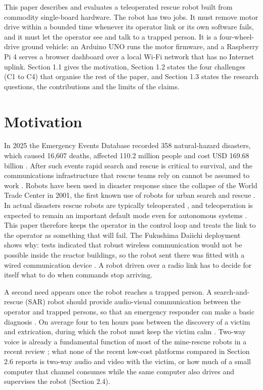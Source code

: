 This paper describes and evaluates a teleoperated rescue robot built from commodity single-board hardware. The robot has two jobs. It must remove motor drive within a bounded time whenever its operator link or its own software fails, and it must let the operator see and talk to a trapped person. It is a four-wheel-drive ground vehicle: an Arduino UNO runs the motor firmware, and a Raspberry Pi 4 serves a browser dashboard over a local Wi-Fi network that has no Internet uplink. Section 1.1 gives the motivation, Section 1.2 states the four challenges (C1 to C4) that organise the rest of the paper, and Section 1.3 states the research questions, the contributions and the limits of the claims.

\section{Motivation}

In 2025 the Emergency Events Database recorded 358 natural-hazard disasters, which caused 16,607 deaths, affected 110.2 million people and cost USD 169.68 billion \cite{cred2026}. After such events rapid search and rescue is critical to survival, and the communications infrastructure that rescue teams rely on cannot be assumed to work \cite{tabib2024}. Robots have been used in disaster response since the collapse of the World Trade Center in 2001, the first known use of robots for urban search and rescue \cite{murphy2004}. In actual disasters rescue robots are typically teleoperated \cite{daun2023}, and teleoperation is expected to remain an important default mode even for autonomous systems \cite{chen2007}. This paper therefore keeps the operator in the control loop and treats the link to the operator as something that will fail. The Fukushima Daiichi deployment shows why: tests indicated that robust wireless communication would not be possible inside the reactor buildings, so the robot sent there was fitted with a wired communication device \cite{nagatani2013}. A robot driven over a radio link has to decide for itself what to do when commands stop arriving.

A second need appears once the robot reaches a trapped person. A search-and-rescue (SAR) robot should provide audio-visual communication between the operator and trapped persons, so that an emergency responder can make a basic diagnosis \cite{schneider2016}. On average four to ten hours pass between the discovery of a victim and extrication, during which the robot must keep the victim calm \cite{srinivasan2012}. Two-way voice is already a fundamental function of most of the mine-rescue robots in a recent review \cite{bakzadeh2026}; what none of the recent low-cost platforms compared in Section 2.6 reports is two-way audio and video with the victim, or how much of a small computer that channel consumes while the same computer also drives and supervises the robot (Section 2.4).

